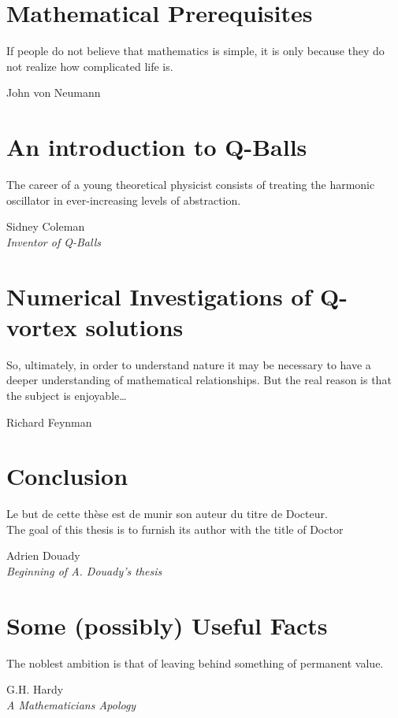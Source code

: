 \documentclass[12pt]{report}
\theoremstyle{definition}
\begin{document}
\chapter{Mathematical Prerequisites}\label{chap:prereqs}
\epigraph{If people do not believe that mathematics is simple, it is only
    because they do not realize how complicated life is.}{John von Neumann}


\chapter{An introduction to Q-Balls}\label{chap:qballs}
\epigraph{The career of a young theoretical physicist consists of treating the
    harmonic oscillator in ever-increasing levels of abstraction.}{Sidney Coleman\\\textit{Inventor of Q-Balls}}


\chapter{Numerical Investigations of Q-vortex solutions}\label{chap:numerics}
\epigraph{So, ultimately, in order to understand nature it may be necessary to
    have a deeper understanding of mathematical relationships. But the real reason
    is that the subject is enjoyable\ldots}{Richard Feynman}


\chapter{Conclusion}\label{chap:conclusion}
\epigraph{Le but de cette thèse est de munir son auteur du titre de Docteur.\\
    The goal of this thesis is to furnish its author with the title of Doctor}{Adrien Douady\\\textit{Beginning of A. Douady's thesis}}


\appendix
\chapter{Some (possibly) Useful Facts}\label{chap:appendix}
\epigraph{The noblest ambition is that of leaving behind something of permanent
    value.}{G.H. Hardy\\\textit{A Mathematicians Apology}}




\end{document}
